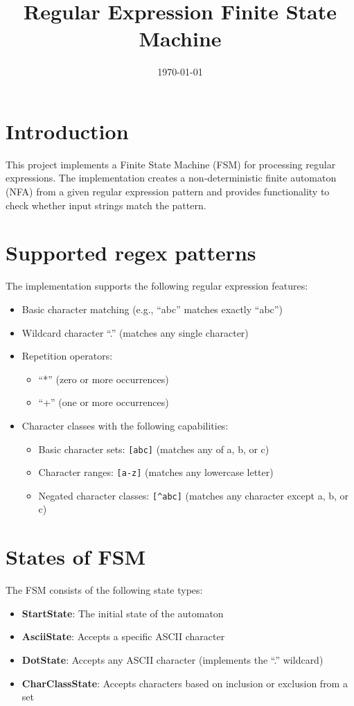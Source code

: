 \documentclass{article}
\title{Regular Expression Finite State Machine}
\date{\today}
\begin{document}
\maketitle

\section{Introduction}
This project implements a Finite State Machine (FSM) for processing regular expressions. The implementation creates a non‑deterministic finite automaton (NFA) from a given regular expression pattern and provides functionality to check whether input strings match the pattern.

\section{Supported regex patterns}
The implementation supports the following regular expression features:
\begin{itemize}
    \item Basic character matching (e.g., ``abc'' matches exactly ``abc'')
    \item Wildcard character ``.'' (matches any single character)
    \item Repetition operators:
    \begin{itemize}
        \item ``*'' (zero or more occurrences)
        \item ``+'' (one or more occurrences)
    \end{itemize}
    \item Character classes with the following capabilities:
    \begin{itemize}
        \item Basic character sets: \verb|[abc]| (matches any of a, b, or c)
        \item Character ranges: \verb|[a-z]| (matches any lowercase letter)
        \item Negated character classes: \verb|[^abc]| (matches any character except a, b, or c)
    \end{itemize}
\end{itemize}

\section{States of FSM}
The FSM consists of the following state types:
\begin{itemize}
    \item \textbf{StartState}: The initial state of the automaton
    \item \textbf{AsciiState}: Accepts a specific ASCII character
    \item \textbf{DotState}: Accepts any ASCII character (implements the ``.'' wildcard)
    \item \textbf{CharClassState}: Accepts characters based on inclusion or exclusion from a set
\end{itemize}
\end{document}
